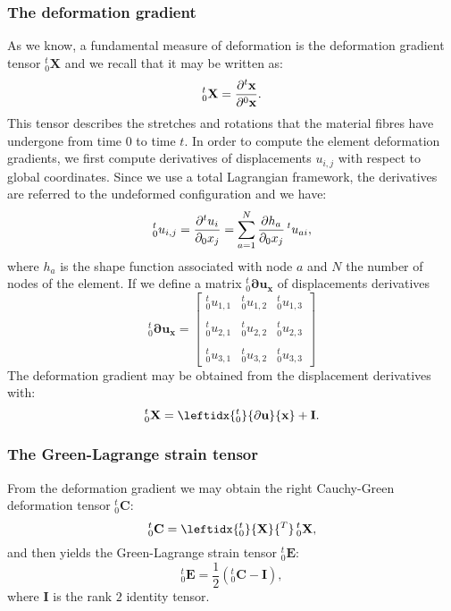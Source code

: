 \subsubsection*{The deformation gradient} 
As we know, a fundamental measure of deformation is the deformation gradient tensor $ _0^t \mathbf{X} $ and we recall that it may be written as:
\begin{equation}
_0^t\mathbf{X} = \dfrac{\partial ^t\mathbf{x}}{\partial ^0\mathbf{x}}.
\end{equation}
This tensor describes the stretches and rotations that the material fibres have undergone from time $0$ to time $t$. In order to compute the element deformation gradients, we first compute derivatives of displacements $ u_{i,j} $ with respect to global coordinates. Since we use a total Lagrangian framework, the derivatives are referred to the undeformed configuration and we have:
\begin{equation}
_0^t u_{i,j} = \dfrac{\partial ^t u_i}{\partial _0 x_j} = \sum_{a=1}^N \dfrac{\partial h_a}{\partial _0 x_j} \, ^t u_{ai},
\end{equation}
where $ h_a $ is the shape function associated with node $ a $ and $ N $ the number of nodes of the element. If we define a matrix $ _0^t \mathbf{\partial u_x} $ of displacements derivatives 
\begin{equation}
_0^t\mathbf{\partial u_x} = 
	\begin{bmatrix}
	_0^t u_{1,1} &         _0^t u_{1,2}      &        _0^t u_{1,3}       \\\\
	_0^t u_{2,1} &         _0^t u_{2,2}      &        _0^t u_{2,3}       \\\\
	_0^t u_{3,1} &         _0^t u_{3,2}      &        _0^t u_{3,3}       
	\end{bmatrix}	
\end{equation}
The deformation gradient may be obtained from the displacement derivatives with:
\begin{equation}
_0^t\mathbf{X} = \leftidx{_0^t}{ \partial \mathbf{u}}{\mathbf{x}} + \mathbf{I}.
\end{equation}

\subsubsection*{The Green-Lagrange strain tensor} 
From the deformation gradient we may obtain the right Cauchy-Green deformation tensor $ _0^t \mathbf{C}  $:
\begin{equation}
_0^t\mathbf{C} = \leftidx{_0^t}{ \mathbf{X} }{^T} \, _0^t\mathbf{X},
\end{equation}
and then yields the Green-Lagrange strain tensor $ _0^t \mathbf{E}  $:
\begin{equation}
\label{chap5:E}
_0^t\mathbf{E}  = \dfrac{1}{2} (_0^t\mathbf{C} - \mathbf{I}), 
\end{equation}
where $ \mathbf{I} $ is the rank $ 2 $ identity tensor. 

